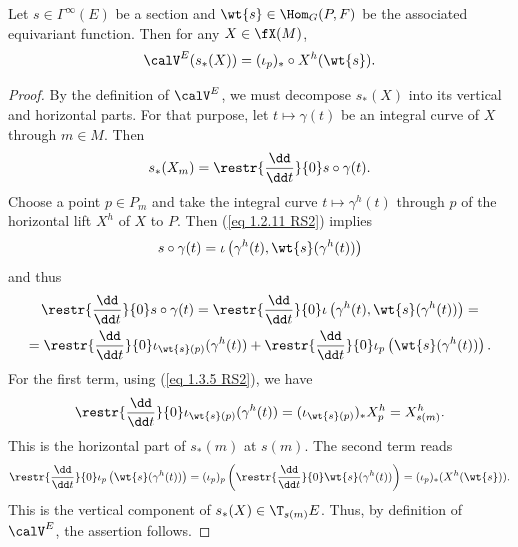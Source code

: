 \begin{prop}[{{\cite[Prop.~1.5.6]{RS2}}}]\label{prop 1.5.6 RS2 my version}
    Let $s\in\Gamma^\infty(E)$ be a section and $\wt{s}\in\Hom_G(P,F)$ be the associated equivariant function. Then for any $X\in\fX(M)$,
    \[\calV^E(s_\ast(X))=(\iota_p)_\ast\circ X^h(\wt{s}).\]
\end{prop}
\begin{proof}
    By the definition of $\calV^E$, we must decompose $s_\ast(X)$ into its vertical and horizontal parts. For that purpose, let $t\mapsto \gamma(t)$ be an integral curve of $X$ through $m\in M$. Then
    \[s_\ast( X_m)=\restr{\frac{\dd}{\dd t}}{0}s\circ \gamma(t).\]
    Choose a point $p\in P_m$ and take the integral curve $t\mapsto \gamma^h(t)$ through $p$ of the horizontal lift $X^h$ of $X$ to $P$. Then (\ref{eq 1.2.11 RS2}) implies
    \[s\circ\gamma(t)=\iota\left(\gamma^h(t),\wt{s}(\gamma^h(t))\right)\]
    and thus
    \begin{multline}
        \restr{\frac{\dd}{\dd t}}{0} s\circ\gamma(t)=\restr{\frac{\dd}{\dd t}}{0} \iota\left(\gamma^h(t),\wt{s}(\gamma^h(t))\right)=\\
        =\restr{\frac{\dd}{\dd t}}{0} \iota_{\wt{s}(p)}(\gamma^h(t))+\restr{\frac{\dd}{\dd t}}{0}\iota_p\left(\wt{s}(\gamma^h(t))\right).
    \end{multline}
    For the first term, using (\ref{eq 1.3.5 RS2}), we have
    \[\restr{\frac{\dd}{\dd t}}{0}\iota_{\wt{s}(p)}(\gamma^h(t))=(\iota_{\wt{s}(p)})_\ast X_p^h=X^h_{s(m)}.\]
    This is the horizontal part of $s_\ast(m)$ at $s(m)$. The second term reads
    \[\restr{\frac{\dd}{\dd t}}{0}\iota_p\left(\wt{s}(\gamma^h(t))\right)= (\iota_p)_p\left(\restr{\frac{\dd}{\dd t}}{0} \wt{s}(\gamma^h(t))\right)=(\iota_p)_\ast(X^h (\wt{s})).\]
    This is the vertical component of $s_\ast(X)\in \T_{s(m)}E$. Thus, by definition of $\calV^E$, the assertion follows.
\end{proof}

